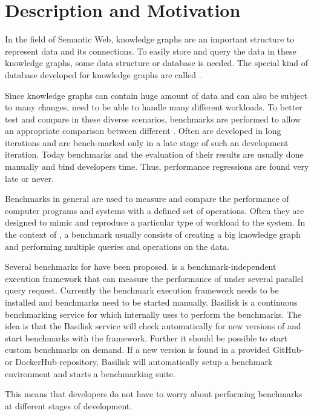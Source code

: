 \chapter{Description and Motivation}
\label{ch:description}

In the field of Semantic Web, knowledge graphs are an important structure to represent data and its connections.
To easily store and query the data in these knowledge graphs, some data structure or database is needed.
The special kind of database developed for knowledge graphs are called \tsp{}.

Since knowledge graphs can contain huge amount of data and can also be subject to many changes, \tsp{} need to be able to handle many different workloads.
To better test and compare \tsp{} in these diverse scenarios, benchmarks are performed to allow an appropriate comparison between different \tsp{}.
Often \tsp{} are developed in long iterations and are bench-marked only in a late stage of such an development iteration.
Today benchmarks and the evaluation of their results are usually done manually and bind developers time.
Thus, performance regressions are  found very late or never.

Benchmarks in general are used to measure and compare the performance of computer programs and systems with a defined set of operations.
Often they are designed to mimic and reproduce a particular type of workload to the system.
In the context of \tsp{}, a benchmark usually consists of creating a big knowledge graph and performing multiple queries and operations on the data.

Several benchmarks for \tsp{} have been proposed.
\iguana{} is a benchmark-independent execution framework \cite{IGUANA} that can measure the performance of \tsp{} under several parallel query request.
Currently the benchmark execution framework needs to be installed and benchmarks need to be started manually.
Basilisk is a continuous benchmarking service for \tsp{} which internally uses \iguana{} to perform the benchmarks.
The idea is that the Basilisk service will check automatically for new versions of \tsp{} and start benchmarks with the \iguana{} framework.
Further it should be possible to start custom benchmarks on demand.
If a new version is found in a provided GitHub- or DockerHub-repository, Basilisk will automatically setup a benchmark environment and starts a benchmarking suite.

This means that developers do not have to worry about performing benchmarks at different stages of development.



